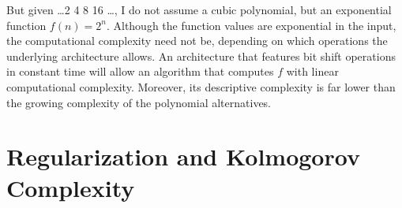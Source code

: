 
But given \dots 2 4 8 16 \dots, I do not assume a cubic polynomial, but an exponential function $f(n)=2^n$. Although the function values are exponential in the input, the computational complexity need not be, depending on which operations the underlying architecture allows. An architecture that features bit shift operations in constant time will allow an algorithm that computes $f$ with linear computational complexity.
Moreover, its descriptive complexity is far lower than the growing complexity of the polynomial alternatives.

\section{Regularization and Kolmogorov Complexity}
